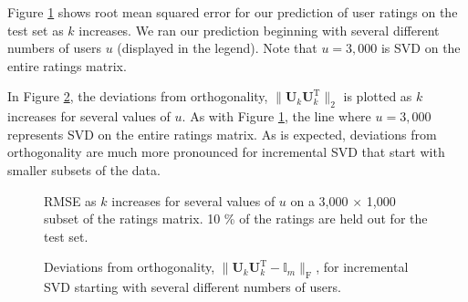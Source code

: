 \documentclass{article} %
\newcommand{\T}{\textrm{T}}
\begin{document}
Figure \ref{fig:error_small} shows root mean squared error for our prediction of user ratings on the test set as $k$ increases.
We ran our prediction beginning with several different numbers of 
users $u$ (displayed in the legend).
Note that $u = 3,000$ is SVD on the entire ratings matrix.

In Figure \ref{fig:ortho_small}, the deviations from orthogonality, 
$\|\mathbf{U}_k\mathbf{U}_k^{\T}\|_2$ is plotted as $k$ increases for several values of $u$. As with Figure \ref{fig:error_small}, the line where $u = 3,000$ represents SVD on the entire ratings matrix. As is expected, deviations from orthogonality are much more pronounced for incremental SVD that start with smaller subsets of the data.

\begin{figure}[H]
\begin{center}
\end{center}
\caption{RMSE as $k$ increases for several values of $u$ on a 3,000 $\times$ 1,000 subset of the ratings matrix. 10 \% of the ratings are held out for the test set.}
\label{fig:error_small}
\end{figure}

\begin{figure}[H]
\begin{center}
\end{center}
\caption{Deviations from orthogonality, 
$\|\mathbf{U}_k\mathbf{U}_k^{\T} - \mathbb{I}_m\|_{\textrm{F}}$, for
incremental SVD starting with several different numbers of users.}
\label{fig:ortho_small}
\end{figure}
\end{document}
